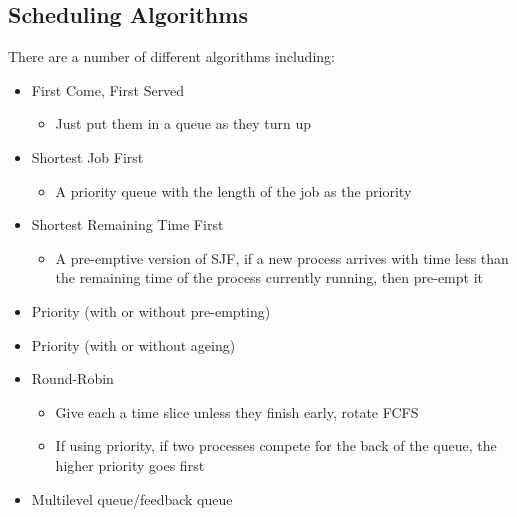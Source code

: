 \documentclass{article}[18pt]
\begin{document}
\subsection{Scheduling Algorithms}
There are a number of different algorithms including:
\begin{itemize}
	\item First Come, First Served
	\begin{itemize}
		\item Just put them in a queue as they turn up
	\end{itemize}
	\item Shortest Job First
	\begin{itemize}
		\item A priority queue with the length of the job as the priority
	\end{itemize}
	\item Shortest Remaining Time First
	\begin{itemize}
		\item A pre-emptive version of SJF, if a new process arrives with time less than the remaining time of the process currently running, then pre-empt it
	\end{itemize}
	\item Priority (with or without pre-empting)
	\item Priority (with or without ageing)
	\item Round-Robin
	\begin{itemize}
		\item Give each a time slice unless they finish early, rotate FCFS
		\item If using priority, if two processes compete for the back of the queue, the higher priority goes first
	\end{itemize}
	\item Multilevel queue/feedback queue
\end{itemize}
\end{document}
